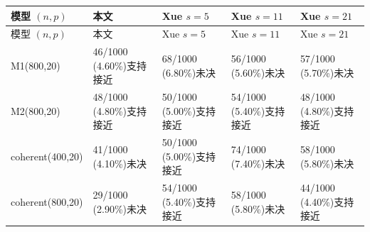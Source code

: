 \begingroup
\fontsize{8.5}{11}\selectfont
\setlength{\tabcolsep}{3pt}
\renewcommand{\arraystretch}{1.15}
\begin{longtable}{p{27mm}p{31mm}p{31mm}p{31mm}p{31mm}}
\toprule
模型 $(n,p)$ & 本文 & Xue $s=5$ & Xue $s=11$ & Xue $s=21$ \\
\midrule
\endfirsthead
\toprule
模型 $(n,p)$ & 本文 & Xue $s=5$ & Xue $s=11$ & Xue $s=21$ \\
\midrule
\endhead
M1\newline (800,20) & 46/1000 (4.60\%)\newline [3.39, 6.09]\newline 支持接近 & 68/1000 (6.80\%)\newline [5.32, 8.54]\newline 未决 & 56/1000 (5.60\%)\newline [4.26, 7.21]\newline 未决 & 57/1000 (5.70\%)\newline [4.35, 7.32]\newline 未决 \\
M2\newline (800,20) & 48/1000 (4.80\%)\newline [3.56, 6.31]\newline 支持接近 & 50/1000 (5.00\%)\newline [3.73, 6.54]\newline 支持接近 & 54/1000 (5.40\%)\newline [4.08, 6.99]\newline 支持接近 & 48/1000 (4.80\%)\newline [3.56, 6.31]\newline 支持接近 \\
coherent\newline (400,20) & 41/1000 (4.10\%)\newline [2.96, 5.52]\newline 未决 & 50/1000 (5.00\%)\newline [3.73, 6.54]\newline 支持接近 & 74/1000 (7.40\%)\newline [5.85, 9.20]\newline 未决 & 58/1000 (5.80\%)\newline [4.43, 7.43]\newline 未决 \\
coherent\newline (800,20) & 29/1000 (2.90\%)\newline [1.95, 4.14]\newline 未决 & 54/1000 (5.40\%)\newline [4.08, 6.99]\newline 支持接近 & 58/1000 (5.80\%)\newline [4.43, 7.43]\newline 未决 & 44/1000 (4.40\%)\newline [3.21, 5.86]\newline 支持接近 \\

\end{longtable}
